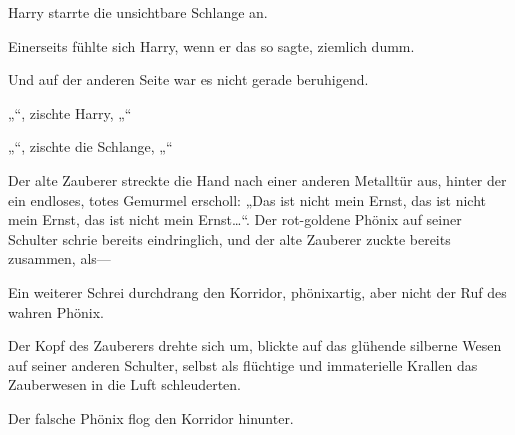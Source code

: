 Harry starrte die unsichtbare Schlange an.

Einerseits fühlte sich Harry, wenn er das so sagte, ziemlich dumm.

Und auf der anderen Seite war es nicht gerade beruhigend.

„“, zischte Harry, „“

„“, zischte die Schlange, „“

\later

Der alte Zauberer streckte die Hand nach einer anderen Metalltür aus, hinter der ein endloses, totes Gemurmel erscholl:
„Das ist nicht mein Ernst, das ist nicht mein Ernst, das ist nicht mein Ernst…“. Der rot-goldene Phönix auf seiner Schulter schrie bereits eindringlich, und der alte Zauberer zuckte bereits zusammen, als—

Ein weiterer Schrei durchdrang den Korridor, phönixartig, aber nicht der Ruf des wahren Phönix.

Der Kopf des Zauberers drehte sich um, blickte auf das glühende silberne Wesen auf seiner anderen Schulter, selbst als flüchtige und immaterielle Krallen das Zauberwesen in die Luft schleuderten.

Der falsche Phönix flog den Korridor hinunter.

